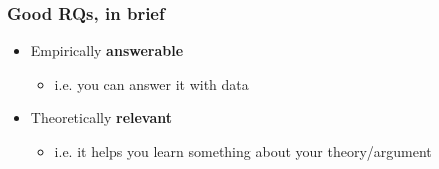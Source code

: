 \begin{frame}
\frametitle{Good RQs, in brief}
\centering

\begin{itemize}
  \item[1.] Empirically \textbf{answerable}
  \begin{itemize}
    \item i.e. you can answer it with data
  \end{itemize}
  \item[2.] Theoretically \textbf{relevant}
  \begin{itemize}
    \item i.e. it helps you learn something about your theory/argument
  \end{itemize}
\end{itemize}

\end{frame}

